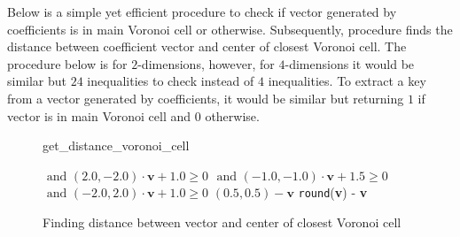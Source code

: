 Below is a simple yet efficient procedure to check if vector generated by coefficients is in main Voronoi cell or otherwise. Subsequently, procedure finds the distance between coefficient vector and center of closest Voronoi cell. The procedure below is for $2$-dimensions, however, for $4$-dimensions it would be similar but $24$ inequalities to check instead of $4$ inequalities. To extract a key from a vector generated by coefficients, it would be similar but returning $1$ if vector is in main Voronoi cell and $0$ otherwise.



\begin{figure}[H]
\centering
        


\begin{algorithm}[H]
    \caption{get\_distance\_voronoi\_cell}
    \begin{algorithmic}[1]
            \State \hspace{\algorithmicindent} $\text{ and } (2.0, -2.0) \cdot \textbf{v} + 1.0 \ge 0$
            \State \hspace{\algorithmicindent} $\text{ and } (-1.0, -1.0) \cdot \textbf{v} + 1.5 \ge 0$ 
            \State \hspace{\algorithmicindent} $\text{ and } (-2.0, 2.0) \cdot \textbf{v} + 1.0 \ge 0$
            \State \hspace{\algorithmicindent} \hspace{\algorithmicindent} \Return $(0.5, 0.5) - \textbf{v}$
            \State \hspace{\algorithmicindent} \hspace{\algorithmicindent} \Return \texttt{round}(\textbf{v}) - \textbf{v}
    \EndProcedure
    \end{algorithmic}
    \end{algorithm}

    \caption{Finding distance between vector and center of closest Voronoi cell}
\end{figure}


